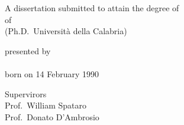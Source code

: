 \begin{titlepage}
    \begin{center}
        \large

        \hfill

        \vfill

        \begingroup
            \spacedallcaps{\myTitle}
        \endgroup

        \vfill

        \begingroup
            A dissertation submitted to attain the degree of\\
            \vspace{0.5em}
            of
             \\
            (Ph.D.\ Universit\`a della Calabria)
        \endgroup

        \vfill

        \begingroup
            presented by\\
            \vspace{0.5em}
            \spacedlowsmallcaps{\myName}\\
            \vspace{0.5em}
            born on 14 February 1990\\
        \endgroup

        \vfill

 \begingroup
      Supervirors\\
    \vspace{0.5em}
     Prof.\ William Spataro\\
     Prof.\ Donato D'Ambrosio
 \endgroup

        \vfill

        \myTime%

        \vfill
    \end{center}
\end{titlepage}

